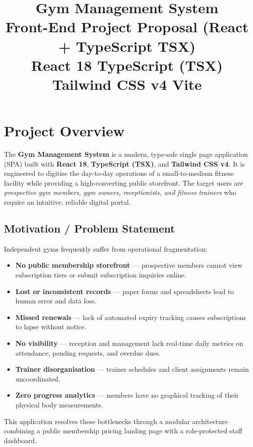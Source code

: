\documentclass[11pt,a4paper]{article}
\title{
  {\Huge\bfseries\color{primaryblue} Gym Management System}\\[6pt]
  {\large\color{darkgray} Front-End Project Proposal (React + TypeScript TSX)}\\[4pt]
  {\small\color{medgray}\faIcon{code}\; React 18 \textbullet{} TypeScript (TSX) \textbullet{} Tailwind CSS v4 \textbullet{} Vite}
}
\newcommand{\oitem}{\item[\textcolor{darkgray}{\faIcon{angle-right}}]}
\begin{document}
\maketitle
\newpage

\section{Project Overview}

The \textbf{Gym Management System} is a modern, type-safe single page application (SPA) built with \textbf{React 18}, \textbf{TypeScript (TSX)}, and \textbf{Tailwind CSS v4}. It is engineered to digitise the day-to-day operations of a small-to-medium fitness facility while providing a high-converting public storefront. The target users are \emph{prospective gym members, gym owners, receptionists, and fitness trainers} who require an intuitive, reliable digital portal.

\subsection*{Motivation / Problem Statement}
Independent gyms frequently suffer from operational fragmentation:
\begin{itemize}[leftmargin=*]
  \oitem \textbf{No public membership storefront} --- prospective members cannot view subscription tiers or submit subscription inquiries online.
  \oitem \textbf{Lost or inconsistent records} --- paper forms and spreadsheets lead to human error and data loss.
  \oitem \textbf{Missed renewals} --- lack of automated expiry tracking causes subscriptions to lapse without notice.
  \oitem \textbf{No visibility} --- reception and management lack real-time daily metrics on attendance, pending requests, and overdue dues.
  \oitem \textbf{Trainer disorganisation} --- trainer schedules and client assignments remain uncoordinated.
  \oitem \textbf{Zero progress analytics} --- members have no graphical tracking of their physical body measurements.
\end{itemize}

This application resolves these bottlenecks through a modular architecture combining a public membership pricing landing page with a role-protected staff dashboard.
\end{document}
